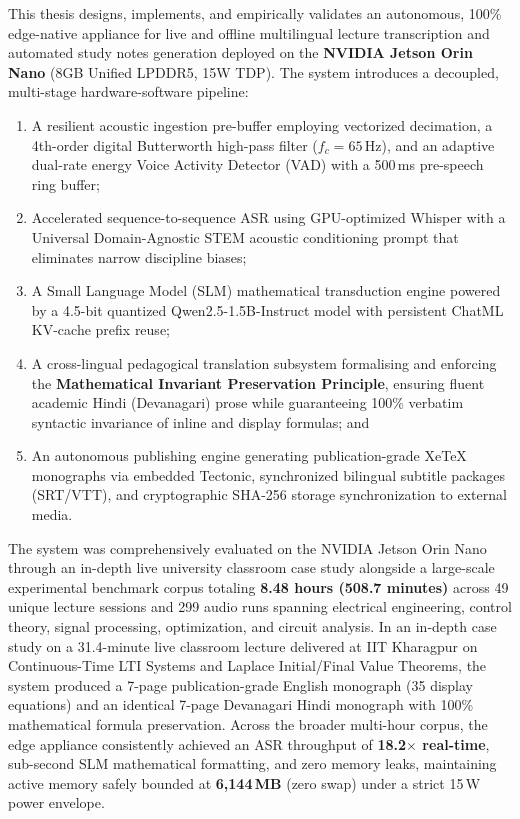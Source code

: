 \documentclass[11pt,a4paper,oneside]{report}
\begin{document}
This thesis designs, implements, and empirically validates an autonomous, 100\% edge-native appliance for live and offline multilingual lecture transcription and automated study notes generation deployed on the \textbf{NVIDIA Jetson Orin Nano} (8GB Unified LPDDR5, 15W TDP). The system introduces a decoupled, multi-stage hardware-software pipeline:
\begin{enumerate}[noitemsep]
    \item A resilient acoustic ingestion pre-buffer employing vectorized decimation, a 4th-order digital Butterworth high-pass filter ($f_c = 65$\,Hz), and an adaptive dual-rate energy Voice Activity Detector (VAD) with a 500\,ms pre-speech ring buffer;
    \item Accelerated sequence-to-sequence ASR using GPU-optimized Whisper with a Universal Domain-Agnostic STEM acoustic conditioning prompt that eliminates narrow discipline biases;
    \item A Small Language Model (SLM) mathematical transduction engine powered by a 4.5-bit quantized Qwen2.5-1.5B-Instruct model with persistent ChatML KV-cache prefix reuse;
    \item A cross-lingual pedagogical translation subsystem formalising and enforcing the \textbf{Mathematical Invariant Preservation Principle}, ensuring fluent academic Hindi (Devanagari) prose while guaranteeing 100\% verbatim syntactic invariance of inline and display formulas; and
    \item An autonomous publishing engine generating publication-grade XeTeX monographs via embedded Tectonic, synchronized bilingual subtitle packages (SRT/VTT), and cryptographic SHA-256 storage synchronization to external media.
\end{enumerate}

The system was comprehensively evaluated on the NVIDIA Jetson Orin Nano through an in-depth live university classroom case study alongside a large-scale experimental benchmark corpus totaling \textbf{8.48 hours (508.7 minutes)} across 49 unique lecture sessions and 299 audio runs spanning electrical engineering, control theory, signal processing, optimization, and circuit analysis. In an in-depth case study on a 31.4-minute live classroom lecture delivered at IIT Kharagpur on Continuous-Time LTI Systems and Laplace Initial/Final Value Theorems, the system produced a 7-page publication-grade English monograph (35 display equations) and an identical 7-page Devanagari Hindi monograph with 100\% mathematical formula preservation. Across the broader multi-hour corpus, the edge appliance consistently achieved an ASR throughput of \textbf{18.2$\times$ real-time}, sub-second SLM mathematical formatting, and zero memory leaks, maintaining active memory safely bounded at \textbf{6,144\,MB} (zero swap) under a strict 15\,W power envelope.
\end{document}
